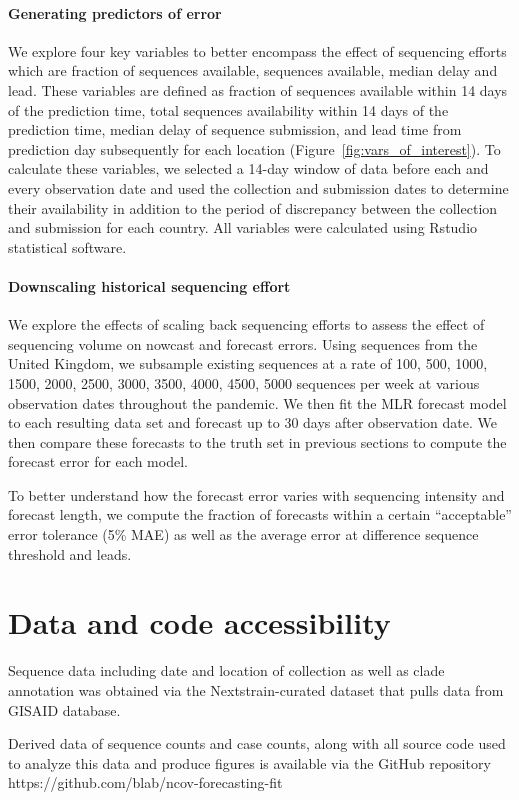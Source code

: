 \documentclass[11pt,oneside,letterpaper]{article}
\begin{document}
\paragraph{Generating predictors of error}

We explore four key variables to better encompass the effect of sequencing efforts which are fraction of sequences available, sequences available, median delay and lead. 
These variables are defined as fraction of sequences available within 14 days of the prediction time, total sequences availability within 14 days of the prediction time, median delay of sequence submission, and lead time from prediction day subsequently for each location (Figure~\ref{fig:vars_of_interest}).
To calculate these variables, we selected a 14-day window of data before each and every observation date and used the collection and submission dates to determine their availability in addition to the period of discrepancy between the collection and submission for each country.
All variables were calculated using Rstudio statistical software. 



\paragraph{Downscaling historical sequencing effort}

We explore the effects of scaling back sequencing efforts to assess the effect of sequencing volume on nowcast and forecast errors.
Using sequences from the United Kingdom, we subsample existing sequences at a rate of 100, 500, 1000, 1500, 2000, 2500, 3000, 3500, 4000, 4500, 5000 sequences per week at various observation dates throughout the pandemic.
We then fit the MLR forecast model to each resulting data set and forecast up to 30 days after observation date.
We then compare these forecasts to the truth set in previous sections to compute the forecast error for each model.

To better understand how the forecast error varies with sequencing intensity and forecast length, we compute the fraction of forecasts within a certain ``acceptable'' error tolerance (5\% MAE) as well as the average error at difference sequence threshold and leads.


\section*{Data and code accessibility}

Sequence data including date and location of collection as well as clade annotation was obtained via the Nextstrain-curated
dataset that pulls data from GISAID database. 


Derived data of sequence counts and case counts, along with all source code used to analyze
this data and produce figures is available via the GitHub repository https://github.com/blab/ncov-forecasting-fit




\end{document}
